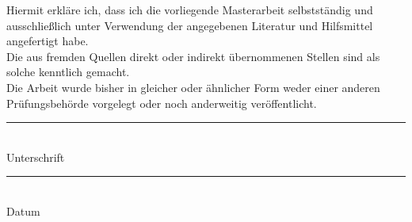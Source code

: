 \documentclass[thesis.tex]{subfiles}
\newcommand{\doublesignature}[3]{%
  \parbox{\textwidth}{
    \parbox{7cm}{
      \rule{6cm}{1pt}\\
       #1 
    }
    \hfill
    \parbox{7cm}{
      \rule{6cm}{1pt}\\
      #2
    }
  }
}
\begin{document}


Hiermit erkläre ich, dass ich die vorliegende Masterarbeit selbstständig und ausschließlich unter Verwendung der angegebenen Literatur und Hilfsmittel angefertigt habe.\\
Die aus fremden Quellen direkt oder indirekt übernommenen Stellen sind als solche kenntlich gemacht.\\

Die Arbeit wurde bisher in gleicher oder ähnlicher Form weder einer anderen Prüfungsbehörde vorgelegt oder noch anderweitig veröffentlicht.
\vspace{100pt}

\doublesignature{Unterschrift}{Datum}

\newpage
\end{document}
